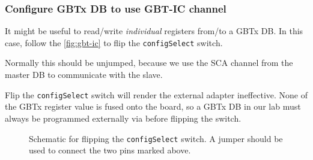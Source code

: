 \subsubsection{Configure GBTx DB to use GBT-IC channel}
It might be useful to read/write \emph{individual} registers from/to a GBTx DB.
In this case, follow the \autoref{fig:gbt-ic} to flip the \texttt{configSelect}
switch.

\begin{leftbar}
    Normally this should be unjumped, because we use the SCA \itwoc channel from
    the master DB to communicate with the slave.
\end{leftbar}

\begin{leftbar}
    Flip the \texttt{configSelect} switch will render the external \itwoc
    adapter ineffective.
    None of the GBTx register value is fused onto the board, so a GBTx DB in
    our lab must always be programmed externally via \itwoc before flipping the
    switch.
\end{leftbar}

\begin{figure}[!ht]
\centering
{}
\caption{
    Schematic for flipping the \texttt{configSelect} switch. A jumper should be
    used to connect the two pins marked above.
}
\label{fig:gbt-ic}
\end{figure}

